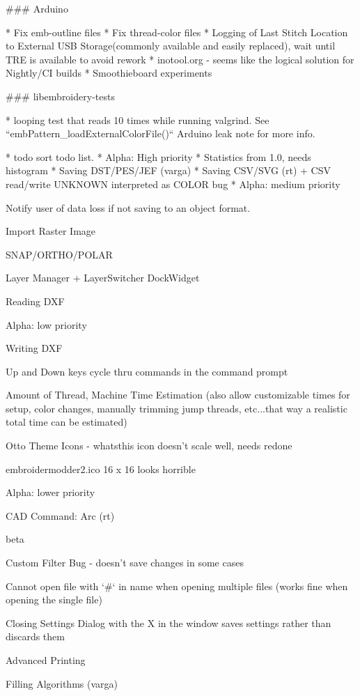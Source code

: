 ### Arduino

* Fix emb-outline files
* Fix thread-color files
* Logging of Last Stitch Location to External USB Storage(commonly available and easily replaced), wait until TRE is available to avoid rework
* inotool.org - seems like the logical solution for Nightly/CI builds
* Smoothieboard experiments

### libembroidery-tests

* looping test that reads 10 times while running valgrind. See ``embPattern\_loadExternalColorFile()`` Arduino leak note for more info.

* todo sort todo list.
* Alpha: High priority
  * Statistics from 1.0, needs histogram
  * Saving DST/PES/JEF (varga)
  * Saving CSV/SVG (rt) + CSV read/write UNKNOWN interpreted as COLOR bug
* Alpha: medium priority
  \item Notify user of data loss if not saving to an object format.
  \item Import Raster Image
  \item SNAP/ORTHO/POLAR
  \item Layer Manager + LayerSwitcher DockWidget
  \item Reading DXF
\item Alpha: low priority
  \item Writing DXF\item Up and Down keys cycle thru commands in the command prompt
  \item Amount of Thread, Machine Time Estimation (also allow customizable times for setup, color changes, manually trimming jump threads, etc...that way a realistic total time can be estimated)
  \item Otto Theme Icons - whatsthis icon doesn't scale well, needs redone
  \item embroidermodder2.ico 16 x 16 looks horrible
\item Alpha: lower priority
  \item CAD Command: Arc (rt)
\item beta
  \item Custom Filter Bug - doesn't save changes in some cases
  \item Cannot open file with `\#` in name when opening multiple files (works fine when opening the single file)
  \item Closing Settings Dialog with the X in the window saves settings rather than discards them
  \item Advanced Printing
  \item Filling Algorithms (varga)
